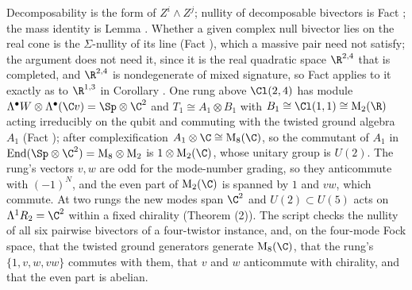 Decomposability is the form of $Z^{i} \wedge Z^{j}$; nullity of decomposable bivectors is Fact ; the mass identity is Lemma . Whether a given complex null bivector lies on the real cone is the $\Sigma$-nullity of its line (Fact ), which a massive pair need not satisfy; the argument does not need it, since it is the real quadratic space $\R^{2,4}$ that is completed, and $\R^{2,4}$ is nondegenerate of mixed signature, so Fact  applies to it exactly as to $\R^{1,3}$ in Corollary . One rung above $\Cl(2,4)$ has module $\Lambda^{\bullet}W \otimes \Lambda^{\bullet}(\C v) = \Sp \otimes \C^{2}$ and $T_{1} \cong A_{1} \otimes B_{1}$ with $B_{1} \cong \Cl(1,1) \cong \mathrm{M}_{2}(\R)$ acting irreducibly on the qubit and commuting with the twisted ground algebra $A_{1}$ (Fact ); after complexification $A_{1} \otimes \C \cong \mathrm{M}_{8}(\C)$, so the commutant of $A_{1}$ in $\mathrm{End}(\Sp \otimes \C^{2}) = \mathrm{M}_{8} \otimes \mathrm{M}_{2}$ is $1 \otimes \mathrm{M}_{2}(\C)$, whose unitary group is $U(2)$. The rung's vectors $v, w$ are odd for the mode-number grading, so they anticommute with $(-1)^{N}$, and the even part of $\mathrm{M}_{2}(\C)$ is spanned by $1$ and $vw$, which commute. At two rungs the new modes span $\C^{2}$ and $U(2) \subset U(5)$ acts on $\Lambda^{1}R_{2} = \C^{2}$ within a fixed chirality (Theorem (2)). The script checks the nullity of all six pairwise bivectors of a four-twistor instance, and, on the four-mode Fock space, that the twisted ground generators generate $\mathrm{M}_{8}(\C)$, that the rung's $\{1, v, w, vw\}$ commutes with them, that $v$ and $w$ anticommute with chirality, and that the even part is abelian.
